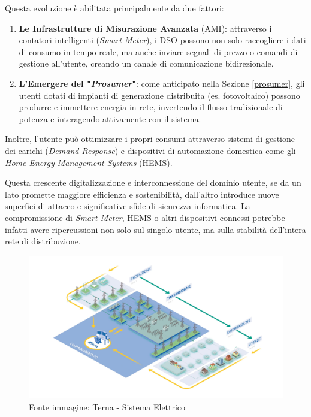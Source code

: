 Questa evoluzione è abilitata principalmente da due fattori:

\begin{enumerate}
    \item \textbf{Le Infrastrutture di Misurazione Avanzata} (AMI): attraverso i contatori intelligenti (\textit{Smart Meter}), i DSO possono non solo raccogliere i dati di consumo in tempo reale, ma anche inviare segnali di prezzo o comandi di gestione all'utente, creando un canale di comunicazione bidirezionale.
    
    \item \textbf{L'Emergere del "\textit{Prosumer}"}: come anticipato nella Sezione \ref{prosumer}, gli utenti dotati di impianti di generazione distribuita (es. fotovoltaico) possono produrre e immettere energia in rete, invertendo il flusso tradizionale di potenza e interagendo attivamente con il sistema.
\end{enumerate}


Inoltre, l'utente può ottimizzare i propri consumi attraverso sistemi di gestione dei carichi (\textit{Demand Response}) e dispositivi di automazione domestica come gli \textit{Home Energy Management Systems} (HEMS).


Questa crescente digitalizzazione e interconnessione del dominio utente, se da un lato promette maggiore efficienza e sostenibilità, dall'altro introduce nuove superfici di attacco e significative sfide di sicurezza informatica. La compromissione di \textit{Smart Meter}, HEMS o altri dispositivi connessi potrebbe infatti avere ripercussioni non solo sul singolo utente, ma sulla stabilità dell'intera rete di distribuzione.



\begin{figure}[h!]
    \centering
    \includegraphics[trim= 6.5cm 0cm 6cm 0cm, clip,width=1\linewidth]{img/Terna-Sistema-Elettrico.png}
    \caption{Fonte immagine: Terna - Sistema Elettrico}
\end{figure}




